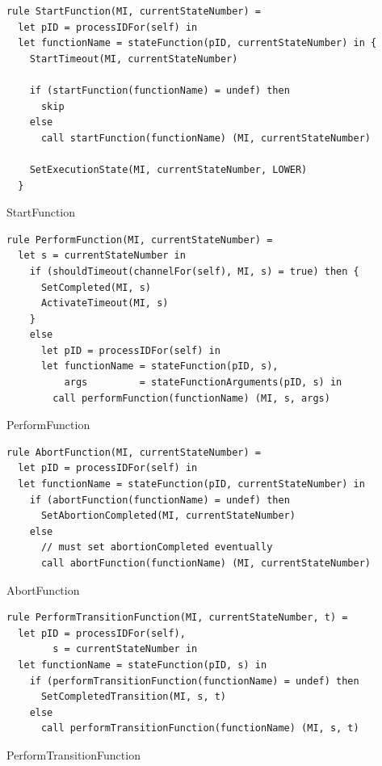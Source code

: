 \begin{listing}[H]
\begin{verbatim}
rule StartFunction(MI, currentStateNumber) =
  let pID = processIDFor(self) in
  let functionName = stateFunction(pID, currentStateNumber) in {
    StartTimeout(MI, currentStateNumber)

    if (startFunction(functionName) = undef) then
      skip
    else
      call startFunction(functionName) (MI, currentStateNumber)

    SetExecutionState(MI, currentStateNumber, LOWER)
  }
\end{verbatim}
\caption{StartFunction}
\label{lst:asm:StartFunction}
\end{listing}




\begin{listing}[H]
\begin{verbatim}
rule PerformFunction(MI, currentStateNumber) =
  let s = currentStateNumber in
    if (shouldTimeout(channelFor(self), MI, s) = true) then {
      SetCompleted(MI, s)
      ActivateTimeout(MI, s)
    }
    else
      let pID = processIDFor(self) in
      let functionName = stateFunction(pID, s),
          args         = stateFunctionArguments(pID, s) in
        call performFunction(functionName) (MI, s, args)
\end{verbatim}
\caption{PerformFunction}
\label{lst:asm:PerformFunction}
\end{listing}




\begin{listing}[H]
\begin{verbatim}
rule AbortFunction(MI, currentStateNumber) =
  let pID = processIDFor(self) in
  let functionName = stateFunction(pID, currentStateNumber) in
    if (abortFunction(functionName) = undef) then
      SetAbortionCompleted(MI, currentStateNumber)
    else
      // must set abortionCompleted eventually
      call abortFunction(functionName) (MI, currentStateNumber)
\end{verbatim}
\caption{AbortFunction}
\label{lst:asm:AbortFunction}
\end{listing}




\begin{listing}[H]
\begin{verbatim}
rule PerformTransitionFunction(MI, currentStateNumber, t) =
  let pID = processIDFor(self),
        s = currentStateNumber in
  let functionName = stateFunction(pID, s) in
    if (performTransitionFunction(functionName) = undef) then
      SetCompletedTransition(MI, s, t)
    else
      call performTransitionFunction(functionName) (MI, s, t)
\end{verbatim}
\caption{PerformTransitionFunction}
\label{lst:asm:PerformTransitionFunction}
\end{listing}




